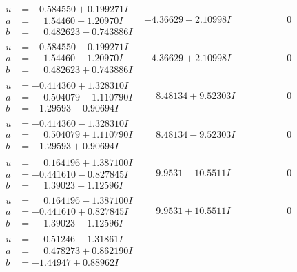 \documentclass[1p]{elsarticle_modified}
\theoremstyle{definition}
\begin{document}
$$\begin{array}{c|c|c}
\begin{aligned}
u &= -0.584550 + 0.199271 I \\
a &= \phantom{-}1.54460 - 1.20970 I \\
b &= \phantom{-}0.482623 - 0.743886 I\end{aligned}
 & -4.36629 - 2.10998 I & \phantom{-0.000000 } 0 \\ \hline\begin{aligned}
u &= -0.584550 - 0.199271 I \\
a &= \phantom{-}1.54460 + 1.20970 I \\
b &= \phantom{-}0.482623 + 0.743886 I\end{aligned}
 & -4.36629 + 2.10998 I & \phantom{-0.000000 } 0 \\ \hline\begin{aligned}
u &= -0.414360 + 1.328310 I \\
a &= \phantom{-}0.504079 - 1.110790 I \\
b &= -1.29593 - 0.90694 I\end{aligned}
 & \phantom{-}8.48134 + 9.52303 I & \phantom{-0.000000 } 0 \\ \hline\begin{aligned}
u &= -0.414360 - 1.328310 I \\
a &= \phantom{-}0.504079 + 1.110790 I \\
b &= -1.29593 + 0.90694 I\end{aligned}
 & \phantom{-}8.48134 - 9.52303 I & \phantom{-0.000000 } 0 \\ \hline\begin{aligned}
u &= \phantom{-}0.164196 + 1.387100 I \\
a &= -0.441610 - 0.827845 I \\
b &= \phantom{-}1.39023 - 1.12596 I\end{aligned}
 & \phantom{-}9.9531 - 10.5511 I & \phantom{-0.000000 } 0 \\ \hline\begin{aligned}
u &= \phantom{-}0.164196 - 1.387100 I \\
a &= -0.441610 + 0.827845 I \\
b &= \phantom{-}1.39023 + 1.12596 I\end{aligned}
 & \phantom{-}9.9531 + 10.5511 I & \phantom{-0.000000 } 0 \\ \hline\begin{aligned}
u &= \phantom{-}0.51246 + 1.31861 I \\
a &= \phantom{-}0.478273 + 0.862190 I \\
b &= -1.44947 + 0.88962 I\end{aligned}

\end{array}$$
\end{document}
